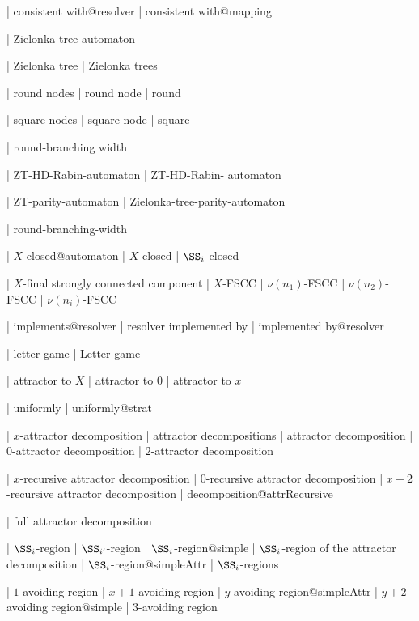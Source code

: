   

  | consistent with@resolver
  | consistent with@mapping

  | Zielonka tree automaton

  | Zielonka tree
  | Zielonka trees

  | round nodes
  | round node
  | round

  | square nodes
  | square node
  | square

  | round-branching width

  | ZT-HD-Rabin-automaton
  | ZT-HD-Rabin- automaton


  | ZT-parity-automaton
  | Zielonka-tree-parity-automaton


| round-branching-width


  | $X$-closed@automaton
  | $X$-closed
  | $\SS _i$-closed

  | $X$-final strongly connected component
  | $X$-FSCC
  | $\nu (n_1)$-FSCC
  | $\nu (n_2)$-FSCC
  | $\nu (n_i)$-FSCC

  | implements@resolver
  | resolver implemented by
  | implemented by@resolver


  
  
  | letter game
  | Letter game

  | attractor to $X$
  | attractor to $0$
  | attractor to $x$
  
  | uniformly
  | uniformly@strat

| $x$-attractor decomposition
| attractor decompositions
| attractor decomposition
| $0$-attractor decomposition
| $2$-attractor decomposition


| $x$-recursive attractor decomposition
| $0$-recursive attractor decomposition
| $x+2$-recursive attractor decomposition
| decomposition@attrRecursive


| full attractor decomposition

  | $\SS _i$-region
  | $\SS _{i'}$-region
  | $\SS _i$-region@simple
  | $\SS _i$-region of the attractor decomposition
  | $\SS _i$-region@simpleAttr
  | $\SS _i$-regions

  
  | $1$-avoiding region
  | $x+1$-avoiding region
  | $y$-avoiding region@simpleAttr
  | $y+2$-avoiding region@simple
  | $3$-avoiding region
  
